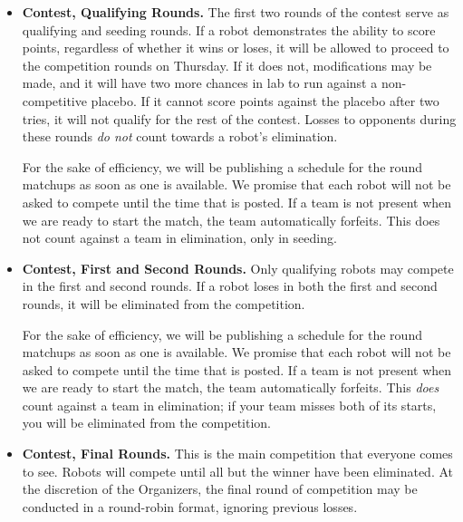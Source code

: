 \begin{itemize}

\item {\bf Contest, Qualifying Rounds.}  The first two rounds of the
  contest serve as qualifying and seeding rounds.  If a robot
  demonstrates the ability to score points, regardless of whether it
  wins or loses, it will be allowed to proceed to the competition
  rounds on Thursday.  If it does not, modifications may be made, and
  it will have two more chances in lab to run against a
  non-competitive placebo.  If it cannot score points against the
  placebo after two tries, it will not qualify for the rest of the
  contest.  Losses to opponents during these rounds {\em do not} count
  towards a robot's elimination.

For the sake of efficiency, we will be publishing a schedule for the
  round matchups as soon as one is available.  We promise that each
  robot will not be asked to compete until the time that is posted.
  If a team is not present when we are ready to start the match, the
  team automatically forfeits.  This does not count against a team in
  elimination, only in seeding.

\item {\bf Contest, First and Second Rounds.}  Only qualifying robots
  may compete in the first and second rounds.  If a robot loses in
  both the first and second rounds, it will be eliminated from the
  competition.

For the sake of efficiency, we will be publishing a schedule for the
  round matchups as soon as one is available.  We promise that each
  robot will not be asked to compete until the time that is posted.
  If a team is not present when we are ready to start the match, the
  team automatically forfeits.  This {\em does} count against a team
  in elimination; if your team misses both of its starts, you will be
  eliminated from the competition.

\item {\bf Contest, Final Rounds.}  This is the main competition that
  everyone comes to see.  Robots will compete until all but the winner
  have been eliminated.  At the discretion of the Organizers, the
  final round of competition may be conducted in a round-robin format,
  ignoring previous losses.

\end{itemize}
